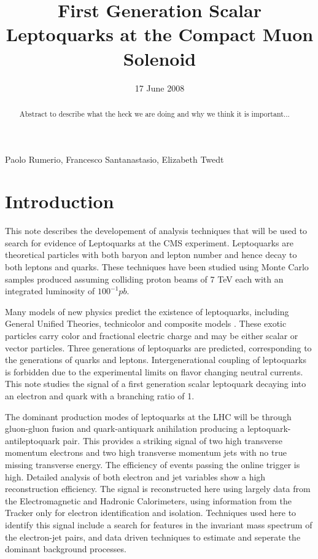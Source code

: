\documentclass{cmspaper}
\begin{document}
\begin{titlepage}

   \date{17 June 2008}

  \title{First Generation Scalar Leptoquarks at the Compact Muon Solenoid}

  \begin{Authlist}
   Paolo Rumerio, Francesco Santanastasio, Elizabeth Twedt
  \end{Authlist}


  \begin{abstract}
    Abstract to describe what the heck we are doing and why we think it is important...
  \end{abstract} 

\end{titlepage}

\setcounter{page}{2}%

\section{Introduction}

This note describes the developement of analysis techniques that will be used to search for evidence  of Leptoquarks at the CMS experiment.  Leptoquarks are theoretical particles with both baryon and lepton number and hence decay to both leptons and quarks.  These techniques have been studied using Monte Carlo samples produced assuming colliding proton beams of 7 TeV each with an integrated luminosity of $100^{-1}pb$. 

Many models of new physics predict the existence of leptoquarks, including General Unified Theories, technicolor and composite models \cite{theories}.  These exotic particles carry color and fractional electric charge and may be either scalar or vector particles.  Three generations of leptoquarks are predicted,  corresponding to the generations of quarks and leptons.  Intergenerational coupling of leptoquarks is forbidden due to the experimental limits on flavor changing neutral currents.  This note studies the signal of a first generation scalar leptoquark decaying into an electron and quark with a branching ratio of 1. 

The dominant production modes of leptoquarks at the LHC will be through gluon-gluon fusion and quark-antiquark anihilation producing a leptoquark-antileptoquark pair.  This provides a striking signal of two high transverse momentum electrons and two high transverse momentum jets with no true missing transverse energy.  The efficiency of events passing the online trigger is high.  Detailed analysis of both electron and jet variables show a high reconstruction efficiency.  The signal is reconstructed here using largely data from the Electromagnetic and Hadronic Calorimeters, using information from the Tracker only for electron identification and isolation.  Techniques used here to identify this signal include a search for features in the invariant mass spectrum of the electron-jet pairs, and data driven techniques to estimate and seperate the dominant background processes.
\end{document}
